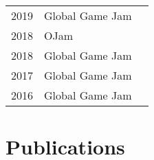 \documentclass[]{deedy-resume-openfont}
\begin{document}
\begin{minipage}[t]{0.66\textwidth}
\begin{tabular}{rll}

2019	     & Global Game Jam\\

2018	     & OJam\\

2018	     & Global Game Jam\\

2017	     & Global Game Jam\\

2016	     & Global Game Jam\\

\end{tabular}
\sectionsep


\section{Publications} 
\renewcommand\refname{\vskip -1.5em} %


\nocite{*}

\end{minipage} 
\end{document}
